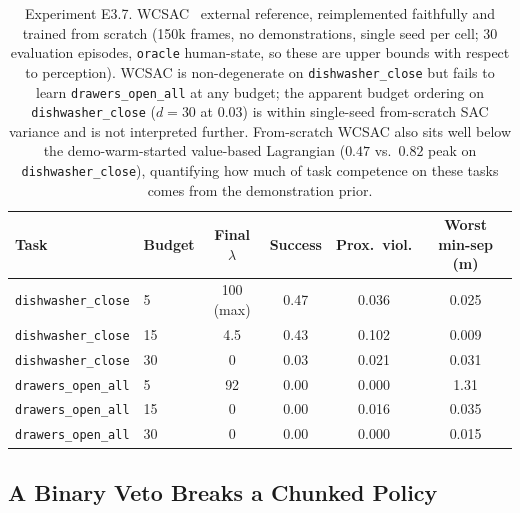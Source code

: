 \documentclass[11pt,a4paper]{report}
\begin{document}
\begin{table}[htbp]
\centering
\small
\caption{Experiment E3.7. WCSAC~\cite{yang2021wcsac} external
reference, reimplemented faithfully and trained from scratch (150k
frames, no demonstrations, single seed per cell; 30 evaluation
episodes, \texttt{oracle} human-state, so these are upper bounds with
respect to perception). WCSAC is non-degenerate on \texttt{dishwasher\_close} but
fails to learn \texttt{drawers\_open\_all} at any budget; the apparent budget ordering on
\texttt{dishwasher\_close} ($d{=}30$ at $0.03$) is within single-seed from-scratch
SAC variance and is not interpreted further. From-scratch WCSAC also
sits well below the demo-warm-started value-based Lagrangian
($0.47$ vs.\ $0.82$ peak on \texttt{dishwasher\_close}), quantifying how much of
task competence on these tasks comes from the demonstration prior.}
\label{tab:e3.7-wcsac}
\begin{tabular}{llcccc}
\toprule
Task & Budget & Final $\lambda$ & Success & Prox.\ viol. & Worst min-sep (m) \\
\midrule
\texttt{dishwasher\_close} & 5  & 100 (max) & 0.47 & 0.036 & 0.025 \\
\texttt{dishwasher\_close} & 15 & 4.5       & 0.43 & 0.102 & 0.009 \\
\texttt{dishwasher\_close} & 30 & 0         & 0.03 & 0.021 & 0.031 \\
\texttt{drawers\_open\_all} & 5  & 92        & 0.00 & 0.000 & 1.31 \\
\texttt{drawers\_open\_all} & 15 & 0         & 0.00 & 0.016 & 0.035 \\
\texttt{drawers\_open\_all} & 30 & 0         & 0.00 & 0.000 & 0.015 \\
\bottomrule
\end{tabular}
\end{table}

\subsection{A Binary Veto Breaks a Chunked Policy}
\label{sec:results:r2-veto}
\end{document}
